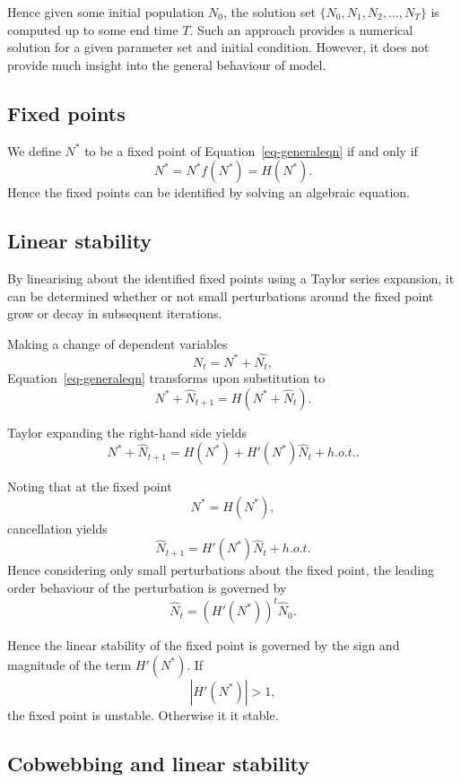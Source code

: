 \documentclass[
  letterpaper,
  DIV=11,
  numbers=noendperiod]{scrreprt}
\begin{document}
Hence given some initial population \(N_0\), the solution set
\(\{N_0,N_1,N_2,...,N_T\}\) is computed up to some end time \(T\). Such
an approach provides a numerical solution for a given parameter set and
initial condition. However, it does not provide much insight into the
general behaviour of model.

\hypertarget{fixed-points}{%
\subsection{Fixed points}\label{fixed-points}}

We define \(N^*\) to be a fixed point of Equation~\ref{eq-generaleqn} if
and only if \[ 
N^*=N^*f(N^*)=H(N^*).
\] Hence the fixed points can be identified by solving an algebraic
equation.

\hypertarget{linear-stability}{%
\subsection{Linear stability}\label{linear-stability}}

By linearising about the identified fixed points using a Taylor series
expansion, it can be determined whether or not small perturbations
around the fixed point grow or decay in subsequent iterations.

Making a change of dependent variables \[
N_t=N^*+\hat{N_t},
\] Equation~\ref{eq-generaleqn} transforms upon substitution to \[
 N^*+\hat{N}_{t+1} =  H(N^*+\hat{N}_t). 
\]

Taylor expanding the right-hand side yields \[
N^*+\hat{N}_{t+1}= H(N^*)+H'(N^*)\hat{N}_t + h.o.t. .
\]

Noting that at the fixed point \[
N^*= H(N^*), 
\] cancellation yields \[
\hat{N}_{t+1} = H'(N^*)\hat{N}_t + h.o.t. 
\] Hence considering only small perturbations about the fixed point, the
leading order behaviour of the perturbation is governed by \[
\hat{N}_{t} = (H'(N^*))^t\hat{N}_0.
\]

Hence the linear stability of the fixed point is governed by the sign
and magnitude of the term \(H'(N^*)\). If \[
 |H'(N^*)| >1,
\] the fixed point is unstable. Otherwise it it stable.

\hypertarget{cobwebbing-and-linear-stability}{%
\subsection{Cobwebbing and linear
stability}\label{cobwebbing-and-linear-stability}}
\end{document}
